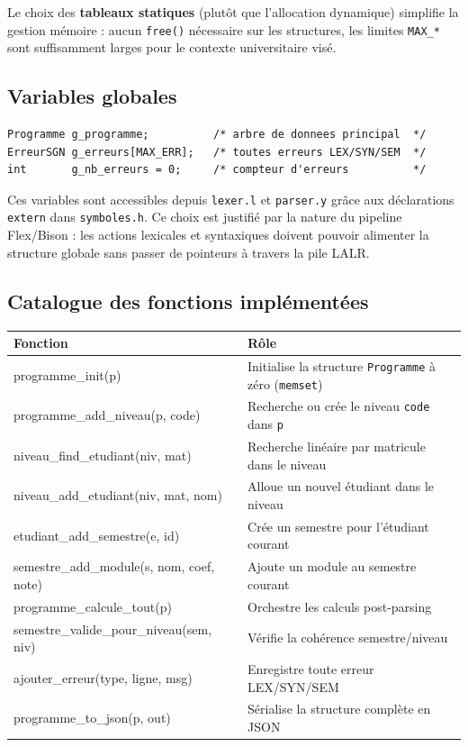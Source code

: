 \documentclass[10pt,a4paper]{article}
\begin{document}
Le choix des \textbf{tableaux statiques} (plutôt que l'allocation dynamique) simplifie
la gestion mémoire : aucun \texttt{free()} nécessaire sur les structures, les limites
\texttt{MAX\_*} sont suffisamment larges pour le contexte universitaire visé.

\subsection{Variables globales}

\begin{lstlisting}[style=styleC, caption={Variables globales définies dans \texttt{main.c}}]
Programme g_programme;          /* arbre de donnees principal  */
ErreurSGN g_erreurs[MAX_ERR];   /* toutes erreurs LEX/SYN/SEM  */
int       g_nb_erreurs = 0;     /* compteur d'erreurs          */
\end{lstlisting}

Ces variables sont accessibles depuis \texttt{lexer.l} et \texttt{parser.y} grâce
aux déclarations \texttt{extern} dans \texttt{symboles.h}. Ce choix est justifié par
la nature du pipeline Flex/Bison : les actions lexicales et syntaxiques doivent pouvoir
alimenter la structure globale sans passer de pointeurs à travers la pile LALR.

\subsection{Catalogue des fonctions implémentées}

\begin{center}
\begin{tabularx}{\linewidth}{>{\ttfamily\small}l X}
\toprule
\normalfont\textbf{Fonction} & \textbf{Rôle} \\
\midrule
programme\_init(p)           & Initialise la structure \texttt{Programme} à zéro (\texttt{memset}) \\
programme\_add\_niveau(p, code) & Recherche ou crée le niveau \texttt{code} dans \texttt{p} \\
niveau\_find\_etudiant(niv, mat) & Recherche linéaire par matricule dans le niveau \\
niveau\_add\_etudiant(niv, mat, nom) & Alloue un nouvel étudiant dans le niveau \\
etudiant\_add\_semestre(e, id) & Crée un semestre pour l'étudiant courant \\
semestre\_add\_module(s, nom, coef, note) & Ajoute un module au semestre courant \\
programme\_calcule\_tout(p) & Orchestre les calculs post-parsing \\
semestre\_valide\_pour\_niveau(sem, niv) & Vérifie la cohérence semestre/niveau \\
ajouter\_erreur(type, ligne, msg) & Enregistre toute erreur LEX/SYN/SEM \\
programme\_to\_json(p, out) & Sérialise la structure complète en JSON \\
\bottomrule
\end{tabularx}
\end{center}
\end{document}
